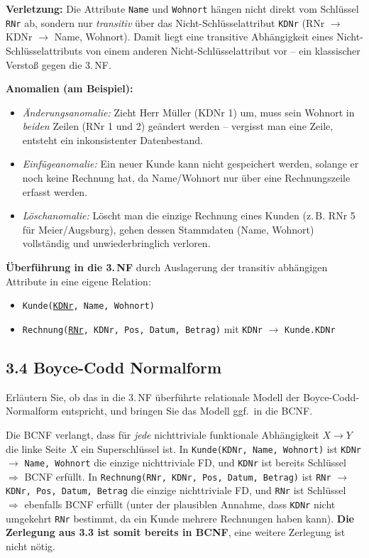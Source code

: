 \documentclass[11pt,a4paper]{article}
\newcommand{\pk}[1]{\underline{#1}}
\begin{document}
\begin{loesung}
\textbf{Verletzung:} Die Attribute \texttt{Name} und \texttt{Wohnort} h\"angen nicht direkt vom Schl\"ussel \texttt{RNr} ab, sondern nur \emph{transitiv} \"uber das Nicht-Schl\"usselattribut \texttt{KDNr} (RNr $\to$ KDNr $\to$ Name, Wohnort). Damit liegt eine transitive Abh\"angigkeit eines Nicht-Schl\"usselattributs von einem anderen Nicht-Schl\"usselattribut vor -- ein klassischer Versto\ss{} gegen die 3.\,NF.

\textbf{Anomalien (am Beispiel):}
\begin{itemize}
\item \emph{\"Anderungsanomalie:} Zieht Herr M\"uller (KDNr 1) um, muss sein Wohnort in \emph{beiden} Zeilen (RNr 1 und 2) ge\"andert werden -- vergisst man eine Zeile, entsteht ein inkonsistenter Datenbestand.
\item \emph{Einf\"ugeanomalie:} Ein neuer Kunde kann nicht gespeichert werden, solange er noch keine Rechnung hat, da Name/Wohnort nur \"uber eine Rechnungszeile erfasst werden.
\item \emph{L\"oschanomalie:} L\"oscht man die einzige Rechnung eines Kunden (z.\,B. RNr 5 f\"ur Meier/Augsburg), gehen dessen Stammdaten (Name, Wohnort) vollst\"andig und unwiederbringlich verloren.
\end{itemize}

\textbf{\"Uberf\"uhrung in die 3.\,NF} durch Auslagerung der transitiv abh\"angigen Attribute in eine eigene Relation:
\begin{itemize}
\item \texttt{Kunde(\pk{KDNr}, Name, Wohnort)}
\item \texttt{Rechnung(\pk{RNr}, KDNr, Pos, Datum, Betrag)} mit \texttt{KDNr} $\to$ \texttt{Kunde.KDNr}
\end{itemize}
\end{loesung}

\subsection*{3.4 \quad Boyce-Codd Normalform}
Erl\"autern Sie, ob das in die 3.\,NF \"uberf\"uhrte relationale Modell der Boyce-Codd-Normalform entspricht, und bringen Sie das Modell ggf.\ in die BCNF.

\begin{loesung}
Die BCNF verlangt, dass f\"ur \emph{jede} nichttriviale funktionale Abh\"angigkeit $X \to Y$ die linke Seite $X$ ein Superschl\"ussel ist. In \texttt{Kunde(KDNr, Name, Wohnort)} ist \texttt{KDNr} $\to$ \texttt{Name, Wohnort} die einzige nichttriviale FD, und \texttt{KDNr} ist bereits Schl\"ussel $\Rightarrow$ BCNF erf\"ullt. In \texttt{Rechnung(RNr, KDNr, Pos, Datum, Betrag)} ist \texttt{RNr} $\to$ \texttt{KDNr, Pos, Datum, Betrag} die einzige nichttriviale FD, und \texttt{RNr} ist Schl\"ussel $\Rightarrow$ ebenfalls BCNF erf\"ullt (unter der plausiblen Annahme, dass \texttt{KDNr} nicht umgekehrt \texttt{RNr} bestimmt, da ein Kunde mehrere Rechnungen haben kann). \textbf{Die Zerlegung aus 3.3 ist somit bereits in BCNF}, eine weitere Zerlegung ist nicht n\"otig.
\end{loesung}
\end{document}
